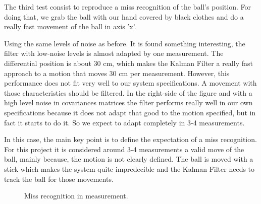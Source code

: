 The third test consist to reproduce a miss recognition of the ball's position. For doing that, we grab the ball with our hand covered by black clothes and do a really fast movement of the ball in axis 'x'. 

Using the same levels of noise as before. It is found something interesting, the filter with low-noise levels is almost adapted by one measurement. The differential position is about 30 cm, which makes the Kalman Filter a really fast approach to a motion that moves 30 cm per measurement. However, this performance does not fit very well to our system specifications. A movement with those characteristics should be filtered. In the right-side of the figure and with a high level noise in covariances matrices the filter performs really well in our own specifications because it does not adapt that good to the motion specified, but in fact it starts to do it. So we expect to adapt completely in 3-4 measurements. 

In this case, the main key point is to define the expectation of a miss recognition. For this project it is considered around 3-4 measurements a valid move of the ball, mainly because, the motion is not clearly defined. The ball is moved with a stick which makes the system quite impredecible and the Kalman Filter needs to track the ball for those movements. 
\begin{figure}[ht!]
\centering
\captionsetup{justification=centering,margin=1cm}
\caption{Miss recognition in measurement.}
\label{fig:kf_uncertainty}
\end{figure}  
